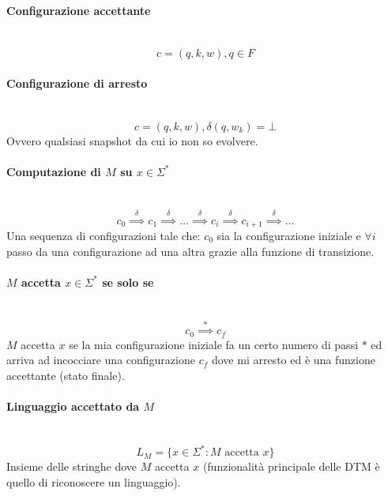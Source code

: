 \documentclass{article}
\begin{document}
\paragraph{Configurazione accettante}\mbox{}\\
$$c=(q,k,w),q\in F$$

\paragraph{Configurazione di arresto}\mbox{}\\
$$c=(q,k,w),\delta(q,w_k)=\bot$$
Ovvero qualsiasi snapshot da cui io non so evolvere.
\paragraph{Computazione di $M$ su $x\in\Sigma^*$}\mbox{}\\
$$c_0\overset{\delta}{\implies}c_1\overset{\delta}{\implies}\dots\overset{\delta}{\implies}
c_i\overset{\delta}{\implies}c_{i+1}\overset{\delta}{\implies}\dots$$
Una sequenza di configurazioni tale che: $c_0$ sia la configurazione iniziale e $\forall i$
passo da una configurazione ad una altra grazie alla funzione di transizione.

\paragraph{$M$ accetta $x\in\Sigma^*$ se solo se}\mbox{}\\
$$c_0\overset{*}{\implies}c_f$$
$M$ accetta $x$ se la mia configurazione iniziale fa un certo numero di passi $*$ ed
arriva ad incocciare una configurazione $c_f$ dove mi arresto ed è una funzione accettante
(stato finale).

\paragraph{Linguaggio accettato da $M$}\mbox{}\\
$$L_M=\{x\in\Sigma^*:M\text{ accetta }x\}$$
Insieme delle stringhe dove $M$ accetta $x$ (funzionalità principale delle DTM è quello
di riconoscere un linguaggio).
\end{document}
